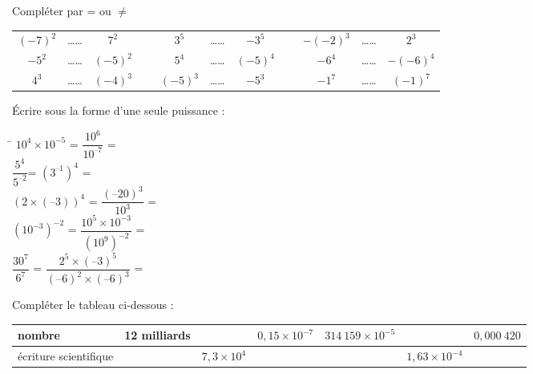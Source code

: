 \documentclass[french,12pt]{report}
\begin{document}
\begin{Exercice}
Compléter par = ou $\neq$ \par 
\begin{center}
\begin{tabular}{ccccccccccc}
$(-7)^2$& \ldots \ldots & $7^2$ & ~& $3^5$ &\ldots \ldots& $-3^5$& ~ & $-(-2)^3$ &\ldots \ldots & $2^3$\\ 
$-5^2$&\ldots \ldots &$(-5)^2$ & ~ & $5^4$ &\ldots \ldots &$(-5)^4$& ~ & $-6^4$ &\ldots \ldots &$-(-6)^4$ \\ 
$4^3$ & \ldots \ldots & $(-4)^3$ & ~& $(-5)^3$ & \ldots \ldots &$-5^3$& ~ & $-1^7$ & \ldots \ldots & $(-1)^7$ \\ 
\end{tabular} 

\end{center}
\end{Exercice}

\medskip
\begin{Exercice}
Écrire sous la forme d’une seule puissance : \par 
\begin{tabbing}
\hspace{8,5cm}\=\kill
$10^4\times 10^{-5}$ = \> $\dfrac{10^6}{10^{–7}}$ =\\
$\dfrac{5^4}{5^{– 2}} $= \> $(3^{–1})^4 $ = \\
$(2 \times (– 3))^4$ = \> $\dfrac{(–20)^3}{10^3}$ = \\[2pt]
$(10^{-3})^{-2}$ = \> $\dfrac{10^5 \times 10^{-3}}{(10^9)^{-2}}$ = \\ [2pt]
$\dfrac{30^7}{6^7} $ = \> $\dfrac{2^5 \times (–3)^5}{(– 6)^2 \times (– 6)^3}$ =  

\end{tabbing}



\end{Exercice}

\medskip
\begin{Exercice}
Compléter le tableau ci-dessous :\par 
\begin{center}
\begin{tabular}{|l|c|c|c|c|c|c|}
\hline 
nombre & 12 milliards & & $0,15\times 10^{-7}$  & $314~159\times 10^{-5}$ &  & $0,000~420$ \\ 
\hline 
écriture scientifique & &  $7,3\times 10^4$ &  &  & $1,63\times 10^{-4}$ &  \\ 
\hline 
\end{tabular} 

\end{center}
\end{Exercice}
\end{document}
